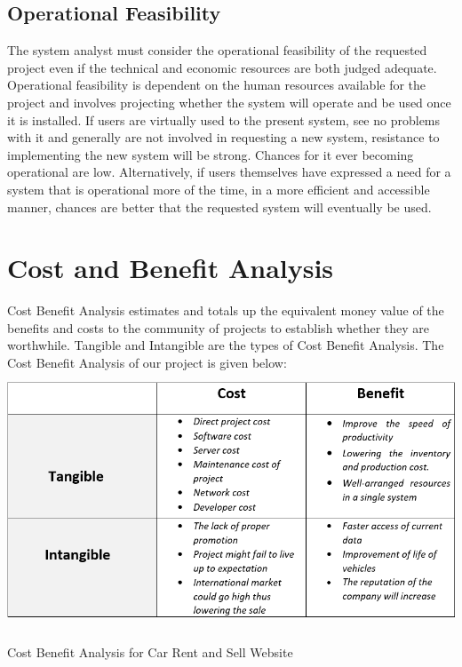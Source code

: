 \documentclass[10pt,twosides]{report}
\begin{document}
\noindent 
\paragraph{}




\begin{table}

\subsection{   Operational Feasibility }
The system analyst must consider the operational feasibility of the requested project even if the technical and economic resources are both judged adequate. Operational feasibility is dependent on the human resources available for the project and involves projecting whether the system will operate and be used once it is installed. If users are virtually used to the present system, see no problems with it and generally are not involved in requesting a new system, resistance to implementing the new system will be strong. Chances for it ever becoming operational are low. Alternatively, if users themselves have expressed a need for a system that is operational more of the time, in a more efficient and accessible manner, chances are better that the requested system will eventually be used.  



\section{   Cost and Benefit Analysis}

Cost Benefit Analysis estimates and totals up the equivalent money value of the benefits and costs to the community of projects to establish whether they are worthwhile. Tangible and Intangible are the types of Cost Benefit Analysis.  The Cost Benefit Analysis of our project is given below:\\

\includegraphics*[width=5.3in, height=3in, keepaspectratio=false]{figures/CostBenifit}

\caption{Cost Benefit Analysis for Car Rent and Sell Website}

\end{table}
\end{document}

